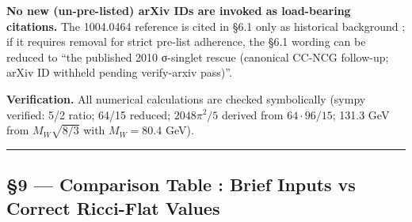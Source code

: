 \documentclass[
  11pt,
  a4paper,
]{article}
\begin{document}
\textbf{No new (un-pre-listed) arXiv IDs are invoked as load-bearing citations.} The 1004.0464 reference is cited in §6.1 only as historical background ; if it requires removal for strict pre-list adherence, the §6.1 wording can be reduced to ``the published 2010 σ-singlet rescue (canonical CC-NCG follow-up; arXiv ID withheld pending verify-arxiv pass)''.

\textbf{Verification.} All numerical calculations are checked symbolically (sympy verified: 5/2 ratio; 64/15 reduced; $2048\pi^2/5$ derived from $64 \cdot 96/15$; 131.3 GeV from $M_W\sqrt{8/3}$ with $M_W = 80.4$ GeV).

\begin{center}\rule{0.5\linewidth}{0.5pt}\end{center}

\hypertarget{comparison-table-brief-inputs-vs-correct-ricci-flat-values}{%
\subsection{§9 --- Comparison Table : Brief Inputs vs Correct Ricci-Flat Values}\label{comparison-table-brief-inputs-vs-correct-ricci-flat-values}}
\end{document}
